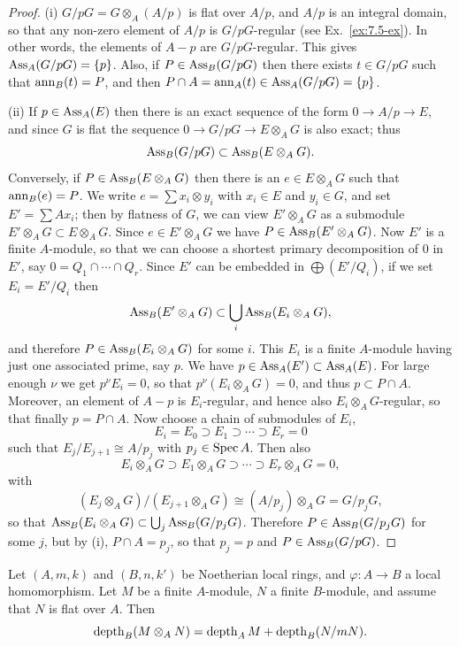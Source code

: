 \begin{proof}
(i) $G/pG = G \otimes_A (A/p)$ is flat over $A/p$, and $A/p$ is an integral domain,
so that any non-zero element of $A/p$ is $G/pG$-regular (see Ex.~\ref{ex:7.5-ex}). In
other words, the elements of $A - p$ are $G/pG$-regular. This gives
$\operatorname{Ass}_A(G/pG) = \{p\}$. Also, if $P \in \operatorname{Ass}_B(G/pG)$ then there exists $t \in G/pG$
such that $\operatorname{ann}_B(t) = P$, and then $P \cap A = \operatorname{ann}_A(t) \in \operatorname{Ass}_A(G/pG) = \{p\}$.

(ii) If $p \in \operatorname{Ass}_A(E)$ then there is an exact sequence of the form
$0 \to A/p \to E$, and since $G$ is flat the sequence $0 \to G/pG \to E \otimes_A G$
is also exact; thus
\[
  \operatorname{Ass}_B(G/pG) \subset \operatorname{Ass}_B(E \otimes_A G).
\]
Conversely, if $P \in \operatorname{Ass}_B(E \otimes_A G)$ then there is an $e \in E \otimes_A G$ such
that $\operatorname{ann}_B(e) = P$. We write $e = \sum x_i \otimes y_i$ with $x_i \in E$ and $y_i \in G$,
and set $E' = \sum Ax_i$; then by flatness of $G$, we can view $E' \otimes_A G$ as a
submodule $E' \otimes_A G \subset E \otimes_A G$. Since $e \in E' \otimes_A G$ we have
$P \in \operatorname{Ass}_B(E' \otimes_A G)$. Now $E'$ is a finite $A$-module, so that we can
choose a shortest primary decomposition of $0$ in $E'$, say
$0 = Q_1 \cap \cdots \cap Q_r$. Since $E'$ can be embedded in $\bigoplus (E'/Q_i)$, if we set
$E_i = E'/Q_i$ then
\[
  \operatorname{Ass}_B(E' \otimes_A G) \subset \bigcup_i \operatorname{Ass}_B(E_i \otimes_A G),
\]
and therefore $P \in \operatorname{Ass}_B(E_i \otimes_A G)$ for some $i$. This $E_i$ is a finite
$A$-module having just one associated prime, say $p$. We have
$p \in \operatorname{Ass}_A(E') \subset \operatorname{Ass}_A(E)$. For large enough $\nu$ we get $p^\nu E_i = 0$, so
that $p^\nu(E_i \otimes_A G) = 0$, and thus $p \subset P \cap A$. Moreover, an
element of $A - p$ is $E_i$-regular, and hence also $E_i \otimes_A G$-regular, so that
finally $p = P \cap A$. Now choose a chain of submodules of $E_i$,
\[
  E_i = E_0 \supset E_1 \supset \cdots \supset E_r = 0
\]
such that $E_j/E_{j+1} \cong A/p_j$ with $p_j \in \operatorname{Spec} A$. Then also
\[
  E_i \otimes_A G \supset E_1 \otimes_A G \supset \cdots \supset E_r \otimes_A G = 0,
\]
with
\[
  (E_j \otimes_A G)/(E_{j+1} \otimes_A G) \cong (A/p_j) \otimes_A G = G/p_jG,
\]
so that $\operatorname{Ass}_B(E_i \otimes_A G) \subset \bigcup_j \operatorname{Ass}_B(G/p_jG)$. Therefore
$P \in \operatorname{Ass}_B(G/p_jG)$ for some $j$, but by (i), $P \cap A = p_j$, so that $p_j = p$
and $P \in \operatorname{Ass}_B(G/pG)$.
\end{proof}

\begin{theorem}\label{thm:23.3}
Let $(A, m, k)$ and $(B, n, k')$ be Noetherian local rings, and
$\varphi\colon A \to B$ a local homomorphism. Let $M$ be a finite $A$-module, $N$ a
finite $B$-module, and assume that $N$ is flat over $A$. Then
\[
  \operatorname{depth}_B(M \otimes_A N) = \operatorname{depth}_A M + \operatorname{depth}_B(N/mN).
\]
\end{theorem}

